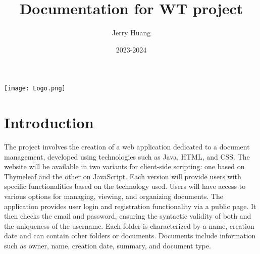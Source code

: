 \documentclass[a4paper,12pt]{article}
\title{Documentation for WT project}
\author{Jerry Huang}
\date{2023-2024}
\begin{document}
\maketitle
\begin{center}
\texttt{[image: Logo.png]}
\end{center}
\newpage
\tableofcontents
\listoffigures

\newpage


\section{Introduction}

The project involves the creation of a web application dedicated to a document management, developed using technologies such as Java, HTML, and CSS. The website will be available in two variants for client-side scripting: one based on Thymeleaf and the other on JavaScript. Each version will provide users with specific functionalities based on the technology used. Users will have access to various options for managing, viewing, and organizing documents. The application provides user login and registration functionality via a public page. It then checks the email and password, ensuring the syntactic validity of both and the uniqueness of the username. Each folder is characterized by a name, creation date and can contain other folders or documents. Documents include information such as owner, name, creation date, summary, and document type. 
\end{document}
